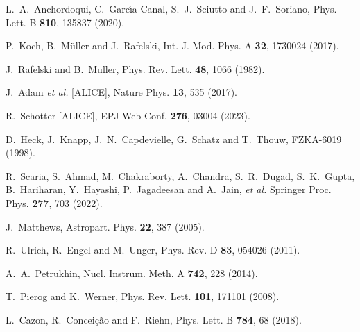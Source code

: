 \documentclass[aps,twocolumn,nofootinbib]{revtex4-1}
\begin{document}
\begin{thebibliography}{}
L.~A.~Anchordoqui, C.~Garc\'\i{}a Canal, S.~J.~Sciutto and J.~F.~Soriano,
Phys. Lett. B \textbf{810}, 135837 (2020).

P.~Koch, B.~M\"uller and J.~Rafelski,
Int. J. Mod. Phys. A \textbf{32}, 1730024 (2017).

J.~Rafelski and B.~Muller,
Phys. Rev. Lett. \textbf{48}, 1066 (1982).

J.~Adam \textit{et al.} [ALICE],
Nature Phys. \textbf{13}, 535 (2017).

R.~Schotter [ALICE],
EPJ Web Conf. \textbf{276}, 03004 (2023).

D.~Heck, J.~Knapp, J.~N.~Capdevielle, G.~Schatz and T.~Thouw,
FZKA-6019 (1998).

R.~Scaria, S.~Ahmad, M.~Chakraborty, A.~Chandra, S.~R.~Dugad, S.~K.~Gupta, B.~Hariharan, Y.~Hayashi, P.~Jagadeesan and A.~Jain, \textit{et al.}
Springer Proc. Phys. \textbf{277}, 703 (2022).

J.~Matthews,
Astropart. Phys. \textbf{22}, 387 (2005).

R.~Ulrich, R.~Engel and M.~Unger,
Phys. Rev. D \textbf{83}, 054026 (2011).

A.~A.~Petrukhin,
Nucl. Instrum. Meth. A \textbf{742}, 228 (2014).

T.~Pierog and K.~Werner,
Phys. Rev. Lett. \textbf{101}, 171101 (2008).

L.~Cazon, R.~Concei\c{c}\~ao and F.~Riehn,
Phys. Lett. B \textbf{784}, 68 (2018).


\end{thebibliography}
\end{document}
